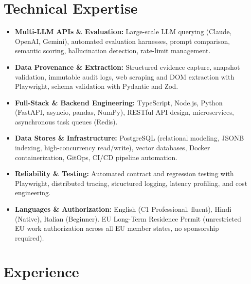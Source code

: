\documentclass[10pt,a4paper]{article}
\begin{document}
\section{Technical Expertise}
\begin{itemize}
  \item \textbf{Multi-LLM APIs \& Evaluation:} Large-scale LLM querying (Claude, OpenAI, Gemini), automated evaluation harnesses, prompt comparison, semantic scoring, hallucination detection, rate-limit management.
  \item \textbf{Data Provenance \& Extraction:} Structured evidence capture, snapshot validation, immutable audit logs, web scraping and DOM extraction with Playwright, schema validation with Pydantic and Zod.
  \item \textbf{Full-Stack \& Backend Engineering:} TypeScript, Node.js, Python (FastAPI, asyncio, pandas, NumPy), RESTful API design, microservices, asynchronous task queues (Redis).
  \item \textbf{Data Stores \& Infrastructure:} PostgreSQL (relational modeling, JSONB indexing, high-concurrency read/write), vector databases, Docker containerization, GitOps, CI/CD pipeline automation.
  \item \textbf{Reliability \& Testing:} Automated contract and regression testing with Playwright, distributed tracing, structured logging, latency profiling, and cost engineering.
  \item \textbf{Languages \& Authorization:} English (C1 Professional, fluent), Hindi (Native), Italian (Beginner). EU Long-Term Residence Permit (unrestricted EU work authorization across all EU member states, no sponsorship required).
\end{itemize}

\section{Experience}
\end{document}
